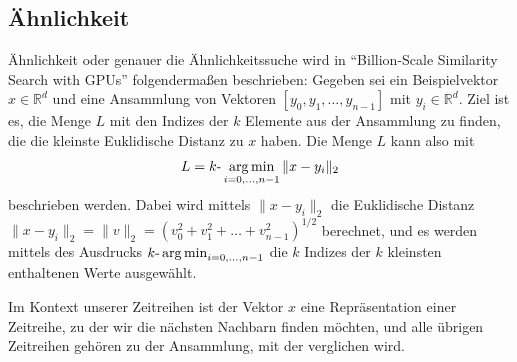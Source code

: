 \subsection{Ähnlichkeit}\label{subsec:aehnlichkeit}
Ähnlichkeit oder genauer die Ähnlichkeitssuche wird in "`Billion-Scale Similarity Search with GPUs"' \cite[Ch. 2]{faissAehnlichkeitssuche} folgendermaßen beschrieben: Gegeben sei ein Beispielvektor $x \in \mathbb{R}^d$ und eine Ansammlung von Vektoren $[y_0,y_1,\ldots,y_{n-1}]$ mit $y_i \in \mathbb{R}^d$. Ziel ist es, die Menge $L$ mit den Indizes der $k$ Elemente aus der Ansammlung zu finden, die die kleinste Euklidische Distanz zu $x$ haben. Die Menge $L$ kann also mit
\[L= k \text{-}\operatorname*{arg\,min}_{i=0,\ldots,n-1}\|x-y_i\|_2\]
beschrieben werden. Dabei wird mittels $\|x-y_i\|_2$ die Euklidische Distanz \\ $\|x-y_i\|_2=\|v\|_2 = (v_0^2+v_1^2+ \ldots +v_{n-1}^2)^{1/2}$ berechnet, und es werden mittels  des Ausdrucks $k\text{-}\operatorname*{arg\,min}_{i=0,\ldots,n-1}$ die $k$ Indizes der $k$ kleinsten enthaltenen Werte ausgewählt.

Im Kontext unserer Zeitreihen ist der Vektor $x$ eine Repräsentation einer Zeitreihe, zu der wir die nächsten Nachbarn finden möchten, und alle übrigen Zeitreihen gehören zu der Ansammlung, mit der verglichen wird.